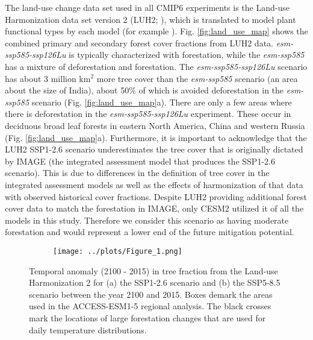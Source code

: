 \documentclass[]{article}
\begin{document}
The land-use change data set used in all CMIP6 experiments is the Land-use Harmonization data set version 2 (LUH2; \cite{hurtt_harmonization_2020}), which is translated to model plant functional types by each model (for example \cite{di_vittorio_land_2014}).
Fig. \ref{fig:land_use_map} shows the combined primary and secondary forest cover fractions from LUH2 data.
\textit{esm-ssp585-ssp126Lu} is typically characterized with forestation, while the \textit{esm-ssp585} has a mixture of deforestation and forestation.
The \textit{esm-ssp585-ssp126Lu} scenario has about 3 million km$^2$ more tree cover than the \textit{esm-ssp585} scenario (an area about the size of India), about 50\%  of which is avoided deforestation in the \textit{esm-ssp585} scenario (Fig. \ref{fig:land_use_map}a).
There are only a few areas where there is deforestation in the \textit{esm-ssp585-ssp126Lu} experiment.
These occur in deciduous broad leaf forests in eastern North America, China and western Russia (Fig. \ref{fig:land_use_map}a).
Furthermore, it is important to acknowledge that the LUH2 SSP1-2.6 scenario underestimates the tree cover that is originally dictated by IMAGE (the integrated assessment model that produces the SSP1-2.6 scenario).
This is due to differences in the definition of tree cover in the integrated assessment models as well as the effects of harmonization of that data with observed historical cover fractions.
Despite LUH2 providing additional forest cover data to match the forestation in IMAGE, only CESM2 utilized it of all the models in this study.
Therefore we consider this scenario as having moderate forestation and would represent a lower end of the future mitigation potential.

\begin{figure}[H]
    \centering
    \begin{subfigure}[b]{\linewidth}
        \texttt{[image: ../plots/Figure\_1.png]}
    \end{subfigure}
    \caption{Temporal anomaly (2100 - 2015) in tree fraction from the Land-use Harmonization 2 for (a) the SSP1-2.6 scenario and (b) the SSP5-8.5 scenario between the year 2100 and 2015. Boxes demark the areas used in the ACCESS-ESM1-5 regional analysis. The black crosses mark the locations of large forestation changes that are used for daily temperature distributions.}
    \label{fig:land_use}
\end{figure}
\end{document}
